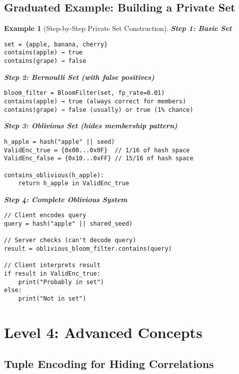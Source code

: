 \documentclass[11pt]{article}
\newtheorem{example}{Example}[section]
\begin{document}
\subsection{Graduated Example: Building a Private Set}

\begin{example}[Step-by-Step Private Set Construction]

\textbf{Step 1: Basic Set}
\begin{verbatim}
set = {apple, banana, cherry}
contains(apple) → true
contains(grape) → false
\end{verbatim}

\textbf{Step 2: Bernoulli Set (with false positives)}
\begin{verbatim}
bloom_filter = BloomFilter(set, fp_rate=0.01)
contains(apple) → true (always correct for members)
contains(grape) → false (usually) or true (1% chance)
\end{verbatim}

\textbf{Step 3: Oblivious Set (hides membership pattern)}
\begin{verbatim}
h_apple = hash("apple" || seed)
ValidEnc_true = {0x00...0x0F}  // 1/16 of hash space
ValidEnc_false = {0x10...0xFF} // 15/16 of hash space

contains_oblivious(h_apple):
    return h_apple in ValidEnc_true
\end{verbatim}

\textbf{Step 4: Complete Oblivious System}
\begin{verbatim}
// Client encodes query
query = hash("apple" || shared_seed)

// Server checks (can't decode query)
result = oblivious_bloom_filter.contains(query)

// Client interprets result
if result in ValidEnc_true:
    print("Probably in set")
else:
    print("Not in set")
\end{verbatim}
\end{example}

\section{Level 4: Advanced Concepts}

\subsection{Tuple Encoding for Hiding Correlations}
\end{document}
